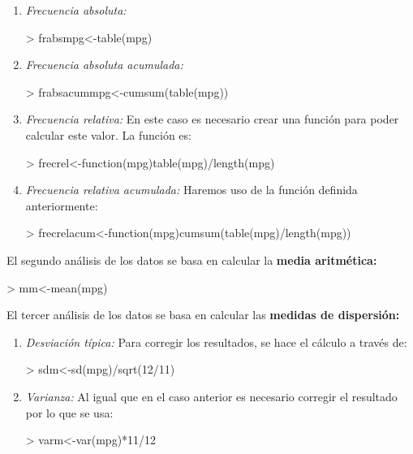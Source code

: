 \documentclass [a4paper] {article}
\begin{document}
\begin{enumerate}
\item
\textit{Frecuencia absoluta: }
\begin{Schunk}
\begin{Sinput}
> frabsmpg<-table(mpg)
\end{Sinput}
\end{Schunk}

\item
\textit{Frecuencia absoluta acumulada: }
\begin{Schunk}
\begin{Sinput}
> frabsacummpg<-cumsum(table(mpg))
\end{Sinput}
\end{Schunk}

\item
\textit{Frecuencia relativa: }En este caso es necesario crear una funci\'on
para poder calcular este valor. La funci\'on es:
\begin{Schunk}
\begin{Sinput}
> frecrel<-function(mpg){table(mpg)/length(mpg)}
\end{Sinput}
\end{Schunk}

\item
\textit{Frecuencia relativa acumulada: }Haremos uso de la funci\'on definida anteriormente:
\begin{Schunk}
\begin{Sinput}
> frecrelacum<-function(mpg){cumsum(table(mpg)/length(mpg))}
\end{Sinput}
\end{Schunk}
\end{enumerate}

\bigskip
El segundo an\'alisis de los datos se basa en calcular la \textbf{media aritm\'etica:}
\begin{Schunk}
\begin{Sinput}
> mm<-mean(mpg)
\end{Sinput}
\end{Schunk}

\bigskip
El tercer an\'alisis de los datos se basa en calcular las \textbf{medidas de dispersi\'on:}
\begin{enumerate}
\item
\textit{Desviaci\'on t\'ipica: }Para corregir los resultados, se hace el c\'alculo
a trav\'es de:
\begin{Schunk}
\begin{Sinput}
> sdm<-sd(mpg)/sqrt(12/11)
\end{Sinput}
\end{Schunk}

\item
\textit{Varianza: }Al igual que en el caso anterior es necesario corregir el 
resultado por lo que se usa:
\begin{Schunk}
\begin{Sinput}
> varm<-var(mpg)*11/12
\end{Sinput}
\end{Schunk}
\end{enumerate}
\end{document}
